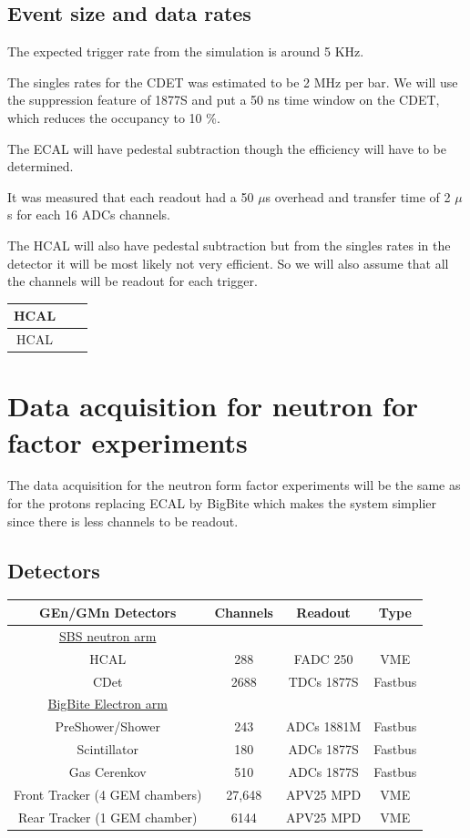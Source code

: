 \documentclass{article}
\begin{document}
\subsection{Event size and data rates}

The expected trigger rate from the simulation is around 5 KHz.

The singles rates for the CDET was estimated to be 2 MHz per bar. We will use the suppression feature of 1877S and put a 50 ns time window on the CDET, which reduces the occupancy to 10 \%.

The ECAL will have pedestal subtraction though the efficiency will have to be determined.

It was measured that each readout had a 50 $\mu$s overhead and transfer time of 2 $\mu$s for each 16 ADCs channels. 

The HCAL will also have pedestal subtraction but from the singles rates in the detector it will be most likely not very efficient.
So we will also assume that all the channels will be readout for each trigger.

\begin{tabular}{|c|c|c|}
\hline
HCAL&&\\
\hline
HCAL&&\\
\hline
\end{tabular}
\section{Data acquisition for neutron for factor experiments}

The data acquisition for the neutron form factor experiments will be the same as for the protons replacing ECAL by BigBite
which makes the system simplier since there is less channels to be readout.


\subsection{Detectors}
\begin{tabular}{|c|c|c|c|}
\hline
\hline
GEn/GMn Detectors & Channels& Readout & Type \\
\hline
\underline{SBS neutron arm} & & & \\
HCAL & 288 & FADC 250 &VME\\
CDet & 2688 & TDCs 1877S&Fastbus\\
\hline
\underline{BigBite Electron arm} & & & \\
PreShower/Shower & 243 & ADCs 1881M&Fastbus\\
Scintillator & 180& ADCs 1877S&Fastbus\\
Gas Cerenkov & 510& ADCs 1877S&Fastbus\\
Front Tracker (4 GEM chambers) & 27,648 & APV25 MPD &VME\\
Rear Tracker (1 GEM chamber) & 6144& APV25 MPD &VME\\
\hline
\end{tabular}
\end{document}

